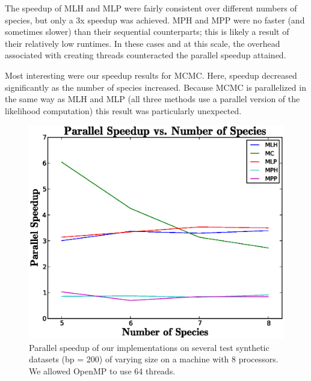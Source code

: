 \documentclass[10pt,twocolumn]{article}
\begin{document}
The speedup of MLH and MLP were fairly consistent over different numbers of species, but only a 3x speedup was achieved. MPH and MPP were no faster (and sometimes slower) than their sequential counterparts; this is likely a result of their relatively low runtimes. In these cases and at this scale, the overhead associated with creating threads counteracted the parallel speedup attained.

Most interesting were our speedup results for MCMC. Here, speedup decreased significantly as the number of species increased. Because MCMC is parallelized in the same way as MLH and MLP (all three methods use a parallel version of the likelihood computation) this result was particularly unexpected.

\begin{figure}[ht!]
\begin{centering}
  \includegraphics[scale=.45]{media/para.eps}
  \caption{Parallel speedup of our implementations on several test synthetic datasets (bp = 200) of varying size on a machine with 8 processors. We allowed OpenMP to use 64 threads.}
  \label{paralleltime}
\end{centering}
\end{figure}
\end{document}
